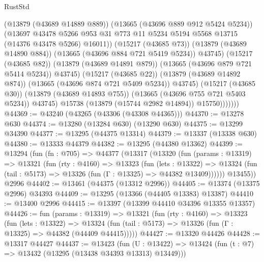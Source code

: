 \begin{lexlean}{RustStd}
\begin{coremodule}
                            (@13879 (@43689 @14889 @889))
                            (@13665 (@43696 @889 @912 @5424 @5234))
                            (@13697
                              @43478
                              @5266
                              @953
                              @31
                              @773
                              @11
                              @5234
                              @5194
                              @5568
                              @13715
                              (@14376 @43478 @5266)
                              @16011))
                          (@15217 (@43685 @73))
                          (@13879 (@43689 @14890 @884))
                          (@13665 (@43696 @884 @721 @5419 @5234))
                          @43745)
                        (@15217 (@43685 @82))
                        (@13879 (@43689 @14891 @879))
                        (@13665 (@43696 @879 @721 @5414 @5234))
                        @43745)
                      (@15217 (@43685 @22))
                      (@13879 (@43689 @14892 @874))
                      (@13665 (@43696 @874 @721 @5409 @5234))
                      @43745)
                    (@15217 (@43685 @30))
                    (@13879 (@43689 @14893 @755))
                    (@13665 (@43696 @755 @721 @5403 @5234))
                    @43745)
                  @15738
                  (@13879 (@15744 @2982 @14894))
                  @15750)))))))
@44369 := @43240 (@43265 (@43306 (@43308 @44365)))
@44370 := @13278 @630
@44374 := @13280 (@13284 @630) (@13290 @630)
@44375 := @13299 @34390
@44377 := @13295 (@44375 @13314)
@44379 := @13337 (@13338 @630)
@44380 := @13333 @44379
@44382 := @13295 (@44380 @13362)
@44399 := @13294
    (fun (fn : @705) =>
    @44377
      (@13317
        (@13320
          (fun (params : @13319) =>
          @13321
            (fun (rty : @4160) =>
            @13323
              (fun (lets : @13322) =>
              @13324 (fun (tail : @5173) => @13326 (fun (Γ : @13325) => @44382 @13409))))))
        @13455))
    @2996
@44402 := @13461 (@44375 (@13312 @2996))
@44405 := @13374 (@13375 @2996) @34393
@44409 := @13295 (@13366 (@44405 @13383) @13387)
@44410 := @13400 @2996
@44415 := @13397 (@13399 @44410 @34396 @13355 @13357)
@44426 := fun (params : @13319) =>
  @13321
    (fun (rty : @4160) =>
    @13323
      (fun (lets : @13322) =>
      @13324 (fun (tail : @5173) => @13326 (fun (Γ : @13325) => @44382 (@44409 @44415)))))
@44427 := @13320 @44426
@44428 := @13317 @44427
@44437 := @13423
    (fun (U : @13422) => @13424 (fun (t : @7) => @13432 (@13295 (@13438 @34393 @13313) @13449)))

\end{coremodule}
\end{lexlean}
